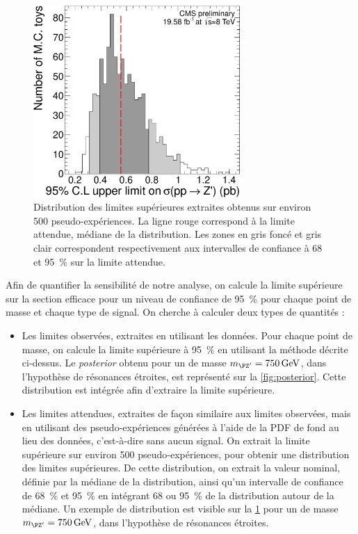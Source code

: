 \begin{figure}[p!]
  \centering
  \includegraphics[width=0.7\textwidth]{chapitre7/figs/posterior_plot_expected_750.pdf}
  \caption{Distribution des limites supérieures extraites obtenus sur environ 500 pseudo-expériences. La ligne rouge correspond à la limite attendue, médiane de la distribution. Les zones en gris foncé et gris clair correspondent respectivement aux intervalles de confiance à 68 et \SI{95}{\%} sur la limite attendue.}
  \label{fig:posterior_mc}
\end{figure}

Afin de quantifier la sensibilité de notre analyse, on calcule la limite supérieure sur la section efficace pour un niveau de confiance de \SI{95}{\percent} pour chaque point de masse et chaque type de signal.
On cherche à calculer deux types de quantités :
\begin{itemize}
  \item Les limites observées, extraites en utilisant les données. Pour chaque point de masse, on calcule la limite supérieure à \SI{95}{\percent} en utilisant la méthode décrite ci-dessus. Le \emph{posterior} obtenu pour un \zprime de masse $\mzp = \SI{750}{\GeV}$, dans l'hypothèse de résonances étroites, est représenté sur la \cref{fig:posterior}. Cette distribution est intégrée afin d'extraire la limite supérieure.
  \item Les limites attendues, extraites de façon similaire aux limites observées, mais en utilisant des pseudo-expériences générées à l'aide de la PDF de fond au lieu des données, c'est-à-dire sans aucun signal. On extrait la limite supérieure sur environ \num{500} pseudo-expériences, pour obtenir une distribution des limites supérieures. De cette distribution, on extrait la valeur nominal, définie par la médiane de la distribution, ainsi qu'un intervalle de confiance de \SI{68}{\percent} et \SI{95}{\%} en intégrant 68 ou \SI{95}{\percent} de la distribution autour de la médiane. Un exemple de distribution est visible sur la \cref{fig:posterior_mc} pour un \zprime de masse $\mzp = \SI{750}{\GeV}$, dans l'hypothèse de résonances étroites.
\end{itemize}

